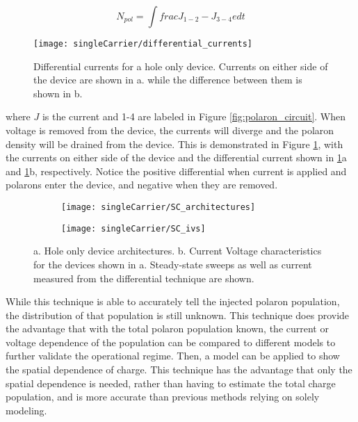 \documentclass[../thesis.tex]{subfiles}
\begin{document}
\begin{equation}
N_{pol}=\int frac{J_{1-2}-J_{3-4}}{e}dt
\label{eqn:polaron_population_calculation}
\end{equation}

\begin{figure}[ht]
\centering
\texttt{[image: singleCarrier/differential\_currents]}
\caption{Differential currents for a hole only device. Currents on either side of the device are shown in a. while the difference between them is shown in b.}
\label{fig:differential_currents}
\end{figure}

where $J$ is the current and 1-4 are labeled in Figure \ref{fig:polaron_circuit}.
When voltage is removed from the device, the currents will diverge and the polaron density will be drained from the device.
This is demonstrated in Figure \ref{fig:differential_currents}, with the currents on either side of the device and the differential current shown in \ref{fig:differential_currents}a and \ref{fig:differential_currents}b, respectively.
Notice the positive differential when current is applied and polarons enter the device, and negative when they are removed.

\begin{wrapfigure}{r}{.5\textwidth}
    \begin{minipage}{\linewidth}
    \centering%
    \begin{subfigure}{.24\textwidth}
    \texttt{[image: singleCarrier/SC\_architectures]}
    \caption{}
    \label{fig:SC_architectures}\par\vfill
    \end{subfigure}

    \begin{subfigure}{.24\textwidth}
    \texttt{[image: singleCarrier/SC\_ivs]}
    \caption{}
    \label{fig:SC_ivs}
    \end{subfigure}
\end{minipage}
\caption{a. Hole only device architectures. b. Current Voltage characteristics for the devices shown in a.  Steady-state sweeps as well as current measured from the differential technique are shown.}
\end{wrapfigure}

While this technique is able to accurately tell the injected polaron population, the distribution of that population is still unknown.
This technique does provide the advantage that with the total polaron population known, the current or voltage dependence of the population can be compared to different models to further validate the operational regime.
Then, a model can be applied to show the spatial dependence of charge.\cite{Pope1999,Mark1962,Lampert2002a}
This technique has the advantage that only the spatial dependence is needed, rather than having to estimate the total charge population, and is more accurate than previous methods relying on solely modeling.
\end{document}
